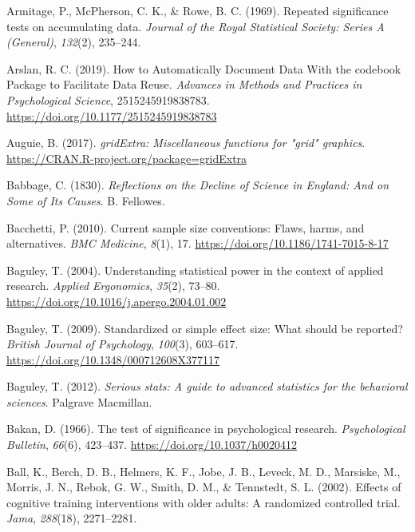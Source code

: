 \documentclass[
  oneside]{krantz}
\newlength{\cslhangindent}
\newlength{\cslentryspacingunit} %
\newenvironment{CSLReferences}[2] %
 {%
  \setlength{\parindent}{0pt}
  \ifodd #1
  \let\oldpar\par
  \def\par{\hangindent=\cslhangindent\oldpar}
  \fi
  \setlength{\parskip}{#2\cslentryspacingunit}
 }%
 {}
\begin{document}
\begin{CSLReferences}{1}{0}
\leavevmode{}%
Armitage, P., McPherson, C. K., \& Rowe, B. C. (1969). Repeated
significance tests on accumulating data. \emph{Journal of the Royal
Statistical Society: Series A (General)}, \emph{132}(2), 235--244.

\leavevmode{}%
Arslan, R. C. (2019). How to {Automatically Document Data With} the
codebook {Package} to {Facilitate Data Reuse}. \emph{Advances in Methods
and Practices in Psychological Science}, 2515245919838783.
\url{https://doi.org/10.1177/2515245919838783}

\leavevmode{}%
Auguie, B. (2017). \emph{gridExtra: Miscellaneous functions for "grid"
graphics}. \url{https://CRAN.R-project.org/package=gridExtra}

\leavevmode{}%
Babbage, C. (1830). \emph{Reflections on the {Decline} of {Science} in
{England}: {And} on {Some} of {Its Causes}}. {B. Fellowes}.

\leavevmode{}%
Bacchetti, P. (2010). Current sample size conventions: {Flaws}, harms,
and alternatives. \emph{BMC Medicine}, \emph{8}(1), 17.
\url{https://doi.org/10.1186/1741-7015-8-17}

\leavevmode{}%
Baguley, T. (2004). Understanding statistical power in the context of
applied research. \emph{Applied Ergonomics}, \emph{35}(2), 73--80.
\url{https://doi.org/10.1016/j.apergo.2004.01.002}

\leavevmode{}%
Baguley, T. (2009). Standardized or simple effect size: {What} should be
reported? \emph{British Journal of Psychology}, \emph{100}(3), 603--617.
\url{https://doi.org/10.1348/000712608X377117}

\leavevmode{}%
Baguley, T. (2012). \emph{Serious stats: A guide to advanced statistics
for the behavioral sciences}. {Palgrave Macmillan}.

\leavevmode{}%
Bakan, D. (1966). The test of significance in psychological research.
\emph{Psychological Bulletin}, \emph{66}(6), 423--437.
\url{https://doi.org/10.1037/h0020412}

\leavevmode{}%
Ball, K., Berch, D. B., Helmers, K. F., Jobe, J. B., Leveck, M. D.,
Marsiske, M., Morris, J. N., Rebok, G. W., Smith, D. M., \& Tennstedt,
S. L. (2002). Effects of cognitive training interventions with older
adults: A randomized controlled trial. \emph{Jama}, \emph{288}(18),
2271--2281.


\end{CSLReferences}
\end{document}
